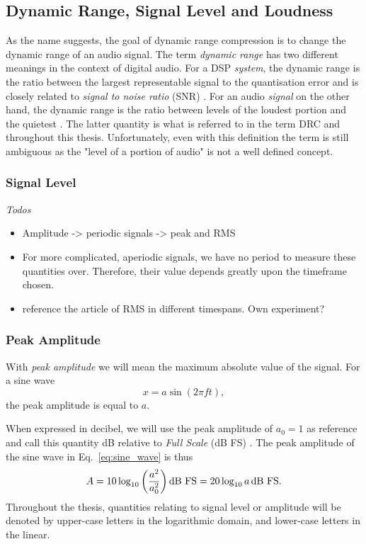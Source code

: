 \documentclass[../main2.tex]{subfiles}
\begin{document}
\subsection{Dynamic Range, Signal Level and Loudness}\label{theory_dynamic_range}
As the name suggests, the goal of dynamic range compression is to change the dynamic range of an audio signal. The term \emph{dynamic range} has two different meanings in the context of digital audio. For a DSP \emph{system}, the dynamic range is the ratio between the largest representable signal to the quantisation error and is closely related to \emph{signal to noise ratio} (SNR)  \cite{wilson1993filter}. For an audio \emph{signal} on the other hand, the dynamic range is the ratio between levels of the loudest portion and the quietest \cite{davis1989sound}. The latter quantity is what is referred to in the term DRC and throughout this thesis. Unfortunately, even with this definition the term is still ambiguous as the "level of a portion of audio" is not a well defined concept.

\subsubsection{Signal Level}
\emph{Todos}
\begin{itemize}
\item Amplitude -> periodic signals -> peak and RMS
\item For more complicated, aperiodic signals, we have no period to measure these quantities over. Therefore, their value depends greatly upon the timeframe chosen.
\item reference the article of RMS in different timespans. Own experiment?
\end{itemize}

\subsubsection{Peak Amplitude}
With \emph{peak amplitude} we will mean the maximum absolute value of the signal. For a sine wave
\begin{equation}\label{eq:sine_wave}
x = a \sin(2 \pi f t),
\end{equation}
the peak amplitude is equal to $a$.

When expressed in decibel, we will use the peak amplitude of $a_0=1$ as reference and call this quantity dB relative to \emph{Full Scale} (dB FS) \cite{XXXX}. The peak amplitude of the sine wave in Eq.~\eqref{eq:sine_wave} is thus
\begin{equation}
A = 10 \log_{10} \left( \frac{a^2}{a_0^2} \right) \text{dB FS} = 20 \log_{10} a \mskip3mu\text{dB FS}.
\end{equation}
Throughout the thesis, quantities relating to signal level or amplitude will be denoted by upper-case letters in the logarithmic domain, and lower-case letters in the linear.
\end{document}
